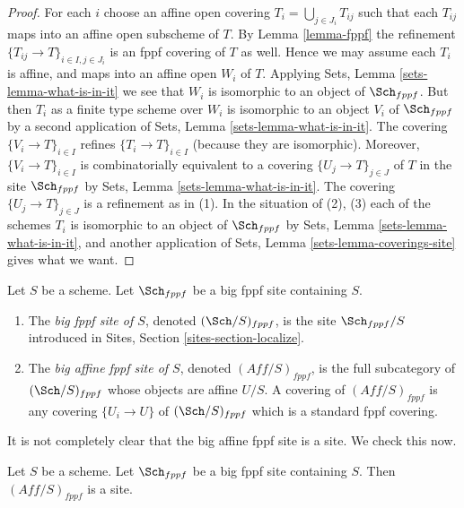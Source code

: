 \begin{proof}
For each $i$ choose an affine open covering $T_i = \bigcup_{j \in J_i} T_{ij}$
such that each $T_{ij}$ maps into an affine open subscheme of $T$. By
Lemma \ref{lemma-fppf}
the refinement $\{T_{ij} \to T\}_{i \in I, j \in J_i}$ is an fppf covering
of $T$ as well. Hence we may assume each $T_i$ is affine, and maps into
an affine open $W_i$ of $T$. Applying
Sets, Lemma \ref{sets-lemma-what-is-in-it}
we see that $W_i$ is isomorphic to an object of $\Sch_{fppf}$.
But then $T_i$ as a finite type scheme over $W_i$
is isomorphic to an object $V_i$ of $\Sch_{fppf}$ by a second
application of
Sets, Lemma \ref{sets-lemma-what-is-in-it}.
The covering $\{V_i \to T\}_{i \in I}$ refines $\{T_i \to T\}_{i \in I}$
(because they are isomorphic).
Moreover, $\{V_i \to T\}_{i \in I}$ is combinatorially equivalent to a
covering $\{U_j \to T\}_{j \in J}$ of $T$ in the site
$\Sch_{fppf}$ by
Sets, Lemma \ref{sets-lemma-what-is-in-it}.
The covering $\{U_j \to T\}_{j \in J}$ is a refinement as in (1).
In the situation of (2), (3) each of the
schemes $T_i$ is isomorphic to an object of $\Sch_{fppf}$ by
Sets, Lemma \ref{sets-lemma-what-is-in-it},
and another application of
Sets, Lemma \ref{sets-lemma-coverings-site}
gives what we want.
\end{proof}

\begin{definition}
\label{definition-big-small-fppf}
Let $S$ be a scheme. Let $\Sch_{fppf}$ be a big fppf
site containing $S$.
\begin{enumerate}
\item The {\it big fppf site of $S$}, denoted
$(\Sch/S)_{fppf}$, is the site $\Sch_{fppf}/S$
introduced in Sites, Section \ref{sites-section-localize}.
\item The {\it big affine fppf site of $S$}, denoted
$(\textit{Aff}/S)_{fppf}$, is the full subcategory of
$(\Sch/S)_{fppf}$ whose objects are affine $U/S$.
A covering of $(\textit{Aff}/S)_{fppf}$ is any covering
$\{U_i \to U\}$ of $(\Sch/S)_{fppf}$ which is a
standard fppf covering.
\end{enumerate}
\end{definition}

\noindent
It is not completely clear that
the big affine fppf site is a site. We check this now.

\begin{lemma}
\label{lemma-verify-site-fppf}
Let $S$ be a scheme. Let $\Sch_{fppf}$ be a big fppf
site containing $S$. Then $(\textit{Aff}/S)_{fppf}$ is a site.
\end{lemma}

